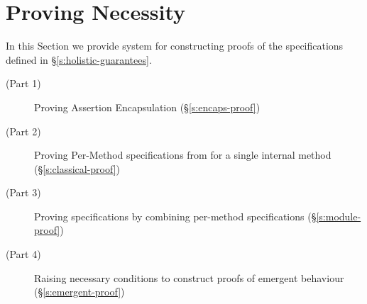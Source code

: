 \section{Proving Necessity}
\label{s:inference}

In this Section we provide  system for constructing 
proofs of the \Nec specifications defined in \S \ref{s:holistic-guarantees}.
\begin{description} 
\item[(Part 1)]
Proving Assertion Encapsulation (\S \ref{s:encaps-proof})
\item[(Part 2)]
Proving Per-Method \Nec specifications from \funcSpecs for a single internal method (\S \ref{s:classical-proof})
\item[(Part 3)]
Proving  \Nec specifications by combining per-method \Nec specifications (\S \ref{s:module-proof})
\item[(Part 4)]
Raising necessary conditions to construct proofs of emergent behaviour (\S \ref{s:emergent-proof})
\end{description}

